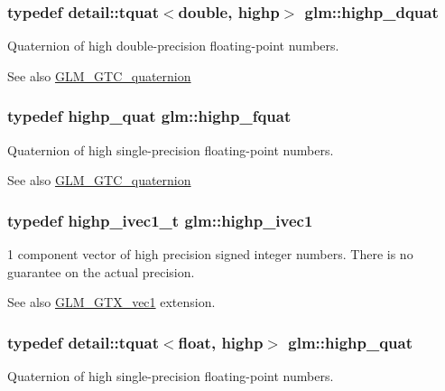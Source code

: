 \subsubsection[{\texorpdfstring{highp\+\_\+dquat}{highp_dquat}}]{\setlength{\rightskip}{0pt plus 5cm}typedef {\bf detail\+::tquat}$<$double, highp$>$ {\bf glm\+::highp\+\_\+dquat}}\hypertarget{namespaceglm_a6504747f6a2ec4a369a51244fcabc61e}{}\label{namespaceglm_a6504747f6a2ec4a369a51244fcabc61e}
Quaternion of high double-\/precision floating-\/point numbers.

\begin{DoxySeeAlso}{See also}
\hyperlink{group__gtc__quaternion}{G\+L\+M\+\_\+\+G\+T\+C\+\_\+quaternion} 
\end{DoxySeeAlso}
\subsubsection[{\texorpdfstring{highp\+\_\+fquat}{highp_fquat}}]{\setlength{\rightskip}{0pt plus 5cm}typedef {\bf highp\+\_\+quat} {\bf glm\+::highp\+\_\+fquat}}\hypertarget{namespaceglm_ad1acf6af4ae4af94dfec8814b058d5eb}{}\label{namespaceglm_ad1acf6af4ae4af94dfec8814b058d5eb}
Quaternion of high single-\/precision floating-\/point numbers.

\begin{DoxySeeAlso}{See also}
\hyperlink{group__gtc__quaternion}{G\+L\+M\+\_\+\+G\+T\+C\+\_\+quaternion} 
\end{DoxySeeAlso}
\subsubsection[{\texorpdfstring{highp\+\_\+ivec1}{highp_ivec1}}]{\setlength{\rightskip}{0pt plus 5cm}typedef {\bf highp\+\_\+ivec1\+\_\+t} {\bf glm\+::highp\+\_\+ivec1}}\hypertarget{namespaceglm_addb6724b01f125e2730aeaad6130b06f}{}\label{namespaceglm_addb6724b01f125e2730aeaad6130b06f}
1 component vector of high precision signed integer numbers. There is no guarantee on the actual precision. \begin{DoxySeeAlso}{See also}
\hyperlink{group__gtx__vec1}{G\+L\+M\+\_\+\+G\+T\+X\+\_\+vec1} extension. 
\end{DoxySeeAlso}
\subsubsection[{\texorpdfstring{highp\+\_\+quat}{highp_quat}}]{\setlength{\rightskip}{0pt plus 5cm}typedef {\bf detail\+::tquat}$<$float, highp$>$ {\bf glm\+::highp\+\_\+quat}}\hypertarget{namespaceglm_a8d2836172e6561f6519c39d0b5d025c1}{}\label{namespaceglm_a8d2836172e6561f6519c39d0b5d025c1}
Quaternion of high single-\/precision floating-\/point numbers.

